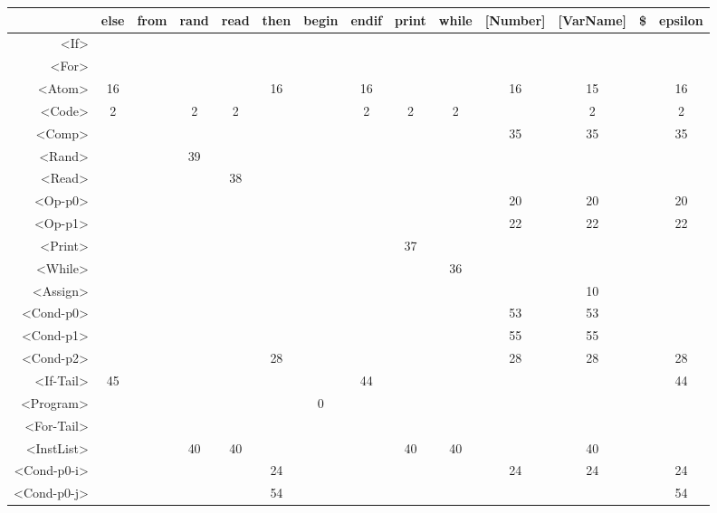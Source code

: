 \begin{tabular}{r|c@{ }c@{ }c@{ }c@{ }c@{ }c@{ }c@{ }c@{ }c@{ }c@{ }c@{ }c@{ }c@{ }}
 & else & from & rand & read & then & begin & endif & print & while & [Number] & [VarName] & \$ & epsilon \\\hline
<If> &   &   &   &   &   &   &   &   &   &   &   &   &   \\\hline
<For> &   &   &   &   &   &   &   &   &   &   &   &   &   \\\hline
<Atom> & 16 &   &   &   & 16 &   & 16 &   &   & 16 & 15 &   & 16 \\\hline
<Code> & 2 &   & 2 & 2 &   &   & 2 & 2 & 2 &   & 2 &   & 2 \\\hline
<Comp> &   &   &   &   &   &   &   &   &   & 35 & 35 &   & 35 \\\hline
<Rand> &   &   & 39 &   &   &   &   &   &   &   &   &   &   \\\hline
<Read> &   &   &   & 38 &   &   &   &   &   &   &   &   &   \\\hline
<Op-p0> &   &   &   &   &   &   &   &   &   & 20 & 20 &   & 20 \\\hline
<Op-p1> &   &   &   &   &   &   &   &   &   & 22 & 22 &   & 22 \\\hline
<Print> &   &   &   &   &   &   &   & 37 &   &   &   &   &   \\\hline
<While> &   &   &   &   &   &   &   &   & 36 &   &   &   &   \\\hline
<Assign> &   &   &   &   &   &   &   &   &   &   & 10 &   &   \\\hline
<Cond-p0> &   &   &   &   &   &   &   &   &   & 53 & 53 &   &   \\\hline
<Cond-p1> &   &   &   &   &   &   &   &   &   & 55 & 55 &   &   \\\hline
<Cond-p2> &   &   &   &   & 28 &   &   &   &   & 28 & 28 &   & 28 \\\hline
<If-Tail> & 45 &   &   &   &   &   & 44 &   &   &   &   &   & 44 \\\hline
<Program> &   &   &   &   &   & 0 &   &   &   &   &   &   &   \\\hline
<For-Tail> &   &   &   &   &   &   &   &   &   &   &   &   &   \\\hline
<InstList> &   &   & 40 & 40 &   &   &   & 40 & 40 &   & 40 &   &   \\\hline
<Cond-p0-i> &   &   &   &   & 24 &   &   &   &   & 24 & 24 &   & 24 \\\hline
<Cond-p0-j> &   &   &   &   & 54 &   &   &   &   &   &   &   & 54 \\\hline

\end{tabular}
